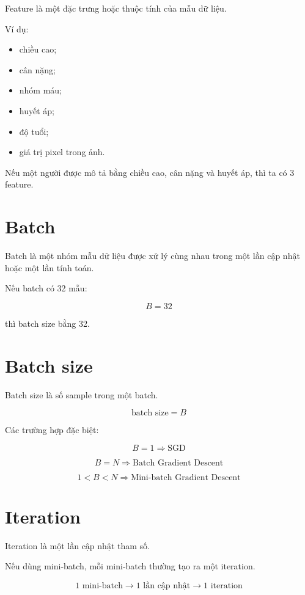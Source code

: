 \documentclass[12pt,a4paper]{report}
\begin{document}
Feature là một đặc trưng hoặc thuộc tính của mẫu dữ liệu.

Ví dụ:

\begin{itemize}
    \item chiều cao;
    \item cân nặng;
    \item nhóm máu;
    \item huyết áp;
    \item độ tuổi;
    \item giá trị pixel trong ảnh.
\end{itemize}

Nếu một người được mô tả bằng chiều cao, cân nặng và huyết áp, thì ta có 3 feature.

\section{Batch}

Batch là một nhóm mẫu dữ liệu được xử lý cùng nhau trong một lần cập nhật hoặc một lần tính toán.

Nếu batch có 32 mẫu:

\[
    B=32
\]

thì batch size bằng 32.

\section{Batch size}

Batch size là số sample trong một batch.

\[
    \text{batch size}=B
\]

Các trường hợp đặc biệt:

\[
    B=1
    \Rightarrow
    \text{SGD}
\]

\[
    B=N
    \Rightarrow
    \text{Batch Gradient Descent}
\]

\[
    1<B<N
    \Rightarrow
    \text{Mini-batch Gradient Descent}
\]

\section{Iteration}

Iteration là một lần cập nhật tham số.

Nếu dùng mini-batch, mỗi mini-batch thường tạo ra một iteration.

\[
    \text{1 mini-batch}
    \rightarrow
    \text{1 lần cập nhật}
    \rightarrow
    \text{1 iteration}
\]
\end{document}
